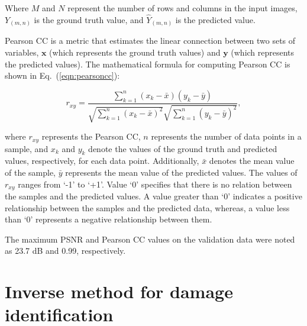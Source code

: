 \documentclass[pdflatex,sn-mathphys-num]{sn-jnl}%
\newcommand{\vect}[1]{\mathbf{#1}} %
\begin{document}
	Where \(M\) and \(N\) represent the number of rows and columns in the input 
	images, $Y_{(m, n)}$ is the ground truth value, and $\hat{Y}_{(m, n)}$ is 
	the predicted value.
	
	Pearson CC is a metric that estimates the linear connection between two 
	sets of variables, \(\vect{x}\) (which represents the ground truth values) 
	and \(\vect{y}\) (which represents the predicted values). 
	The mathematical formula for computing Pearson CC is shown in 
	Eq.~(\ref{eqn:pearsoncc}):
	
	\begin{equation}
		r_{x 
			y}=\frac{\sum_{k=1}^n\left(x_k-\bar{x}\right)\left(y_k-\bar{y}\right)}{\sqrt{\sum_{k=1}^n\left(x_k-\bar{x}\right)^2}
			\sqrt{\sum_{k=1}^n\left(y_k-\bar{y}\right)^2}},
		\label{eqn:pearsoncc}
	\end{equation}
	
	where $r_{xy}$ represents the Pearson CC, \(n\) represents the number of 
	data points in a sample, and $x_k$ and $y_k$ denote the values of the 
	ground truth and predicted values, respectively, for each data point. 
	Additionally, $\bar{x}$ denotes the mean value of the sample, $\bar{y}$ 
	represents the mean value of the predicted values. 
	The values of $r_{xy}$ ranges from ‘-1’ to ‘+1’. 
	Value ‘0’ specifies that there is no relation between the samples and the 
	predicted values. 
	A value greater than ‘0’ indicates a positive relationship between the 
	samples and the predicted data, whereas, a value less than ‘0’ represents a 
	negative relationship between them.
	
	The maximum PSNR and Pearson CC values on the validation data were noted as 
	23.7 dB and 0.99, respectively.
	\section{Inverse method for damage identification}
	
\end{document}
